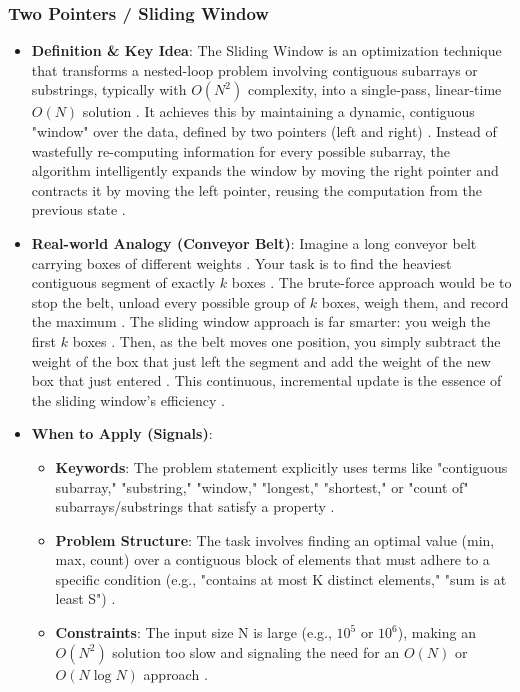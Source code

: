 \documentclass{article}
\begin{document}
\subsubsection{Two Pointers / Sliding Window}
\begin{itemize}
\item \textbf{Definition \& Key Idea}: The Sliding Window is an optimization technique that transforms a nested-loop problem involving contiguous subarrays or substrings, typically with $O(N^2)$ complexity, into a single-pass, linear-time $O(N)$ solution \cite{73, 21}. It achieves this by maintaining a dynamic, contiguous "window" over the data, defined by two pointers (left and right) \cite{74}. Instead of wastefully re-computing information for every possible subarray, the algorithm intelligently expands the window by moving the right pointer and contracts it by moving the left pointer, reusing the computation from the previous state \cite{75}.
\item \textbf{Real-world Analogy (Conveyor Belt)}: Imagine a long conveyor belt carrying boxes of different weights \cite{77}. Your task is to find the heaviest contiguous segment of exactly $k$ boxes \cite{78}. The brute-force approach would be to stop the belt, unload every possible group of $k$ boxes, weigh them, and record the maximum \cite{79}. The sliding window approach is far smarter: you weigh the first $k$ boxes \cite{80, 81}. Then, as the belt moves one position, you simply subtract the weight of the box that just left the segment and add the weight of the new box that just entered \cite{82}. This continuous, incremental update is the essence of the sliding window's efficiency \cite{83}.
\item \textbf{When to Apply (Signals)}:
\begin{itemize}
\item \textbf{Keywords}: The problem statement explicitly uses terms like "contiguous subarray," "substring," "window," "longest," "shortest," or "count of" subarrays/substrings that satisfy a property \cite{86, 88}.
\item \textbf{Problem Structure}: The task involves finding an optimal value (min, max, count) over a contiguous block of elements that must adhere to a specific condition (e.g., "contains at most K distinct elements," "sum is at least S") \cite{89}.
\item \textbf{Constraints}: The input size N is large (e.g., $10^5$ or $10^6$), making an $O(N^2)$ solution too slow and signaling the need for an $O(N)$ or $O(N\log N)$ approach \cite{90}.

\end{itemize}
\end{itemize}
\end{document}
